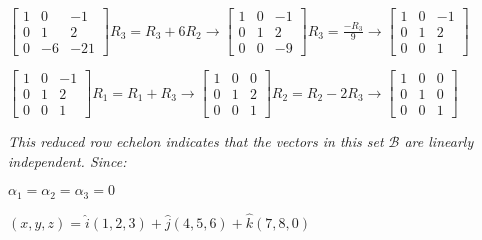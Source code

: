 \documentclass{article}
\begin{document}
{\begin{center}
\end{center}
\begin{center}
	$\begin{bmatrix}
		1 & 0 & -1 \\
		0 & 1 & 2 \\
		0 & -6 & -21
	\end{bmatrix}  R_{3} = R_{3} + 6R_{2}  \rightarrow
\begin{bmatrix}
	1 & 0 & -1 \\
	0 & 1 & 2 \\
	0 & 0 & -9
\end{bmatrix}  R_{3} = \frac{-R_3}{9}  \rightarrow
\begin{bmatrix}
	1 & 0 & -1 \\
	0 & 1 & 2 \\
	0 & 0 & 1
\end{bmatrix} 
$
\end{center}

\begin{center}
$\begin{bmatrix}
	1 & 0 & -1 \\
	0 & 1 & 2 \\
	0 & 0& 1
\end{bmatrix}  R_{1} = R_{1} + R_{3}  \rightarrow
\begin{bmatrix}
	1 & 0 & 0 \\
	0 & 1 & 2 \\
	0 & 0& 1
\end{bmatrix} R_{2} = R_{2} - 2R_{3}  \rightarrow
\begin{bmatrix}
	1 & 0 & 0 \\
	0 & 1 & 0 \\
	0 & 0& 1
\end{bmatrix}
$
\end{center}
\textit{This reduced row echelon indicates that the vectors in this set $\mathcal{B}$ are linearly independent. Since:}
\begin{center}
	$\alpha_{1} = \alpha_{2} = \alpha_{3} = 0$
\end{center}

\begin{center}
$(x,y,z) = \hat{i}(1,2,3) + \hat{j}(4,5,6) + \hat{k}(7, 8, 0)
$


\end{center}}
\end{document}
